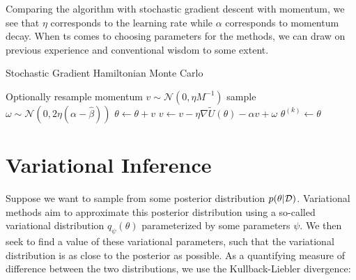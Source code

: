 Comparing the algorithm with stochastic gradient descent with momentum, we see that  $\eta$ corresponds to the learning rate while $\alpha$ corresponds to momentum decay. 
When ts comes to choosing parameters for the methods, we can draw on previous experience and conventional wisdom to some extent.

\begin{algorithm}[htpb]
    \caption{Stochastic Gradient Hamiltonian Monte Carlo} \label{alg:sghmc}
    \begin{algorithmic}
        \State Optionally resample momentum $v \sim \mathcal{N}(0, \eta M^{-1})$
        \State sample $\omega \sim \mathcal{N}(0, 2\eta (\alpha - \hat\beta))$
        \State $\theta \gets \theta + v $ 
        \State $v\gets v - \eta \nabla \tilde{U}(\theta) - \alpha v + \omega$
        \EndFor
        \State $\theta^{(k)} \gets \theta$
        \EndFor
    \end{algorithmic}
\end{algorithm}

\section{Variational Inference}

Suppose we want to sample from some posterior distribution $p(\theta | \mathcal{D})$. 
Variational methods aim to approximate this posterior distribution using a so-called variational distribution $q_\psi (\theta)$ parameterized by some parameters $\psi$.  
We then seek to find a value of these variational parameters, such that the variational distribution is as close to the posterior as possible. 
As a quantifying measure of difference between the two distributions, we use the Kullback-Liebler divergence:



